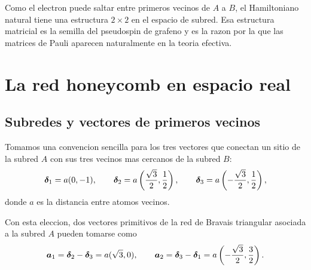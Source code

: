 Como el electron puede saltar entre primeros vecinos de \(A\) a \(B\), el Hamiltoniano natural tiene una estructura \(2\times 2\) en el espacio de subred. Esa estructura matricial es la semilla del pseudospin de grafeno y es la razon por la que las matrices de Pauli aparecen naturalmente en la teoria efectiva.

\section{La red honeycomb en espacio real}

\subsection{Subredes y vectores de primeros vecinos}

Tomamos una convencion sencilla para los tres vectores que conectan un sitio de la subred \(A\) con sus tres vecinos mas cercanos de la subred \(B\):
\begin{equation}
\bm{\delta}_1 = a(0,-1),
\qquad
\bm{\delta}_2 = a\left(\frac{\sqrt{3}}{2},\frac{1}{2}\right),
\qquad
\bm{\delta}_3 = a\left(-\frac{\sqrt{3}}{2},\frac{1}{2}\right),
\label{c02:eq:deltas}
\end{equation}
donde \(a\) es la distancia entre atomos vecinos.

Con esta eleccion, dos vectores primitivos de la red de Bravais triangular asociada a la subred \(A\) pueden tomarse como
\begin{equation}
\bm{a}_1 = \bm{\delta}_2 - \bm{\delta}_3 = a(\sqrt{3},0),
\qquad
\bm{a}_2 = \bm{\delta}_3 - \bm{\delta}_1 = a\left(-\frac{\sqrt{3}}{2},\frac{3}{2}\right).
\label{c02:eq:primitive-real}
\end{equation}

